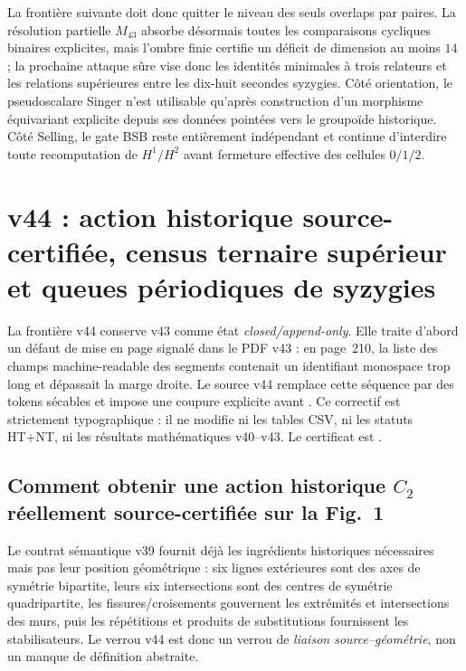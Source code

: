 \documentclass[11pt,a4paper]{article}
\begin{document}
La frontière suivante doit donc quitter le niveau des seuls overlaps par paires. La résolution partielle $M_{43}$ absorbe désormais toutes les comparaisons cycliques binaires explicites, mais l'ombre finie certifie un déficit de dimension au moins $14$ ; la prochaine attaque sûre vise donc les identités minimales à trois relateurs et les relations supérieures entre les dix-huit secondes syzygies. Côté orientation, le pseudoscalare Singer n'est utilisable qu'après construction d'un morphisme équivariant explicite depuis ses données pointées vers le groupoïde historique. Côté Selling, le gate BSB reste entièrement indépendant et continue d'interdire toute recomputation de $H^1/H^2$ avant fermeture effective des cellules $0/1/2$.

\section{v44 : action historique source-certifiée, census ternaire supérieur et queues périodiques de syzygies}
\label{sec:v44-source-action-triples-periodic}

La frontière v44 conserve v43 comme état \emph{closed/append-only}. Elle traite d'abord un défaut de mise en page signalé dans le PDF v43 : en page~210, la liste des champs machine-readable des segments contenait un identifiant monospace trop long et dépassait la marge droite. Le source v44 remplace cette séquence par des tokens  sécables et impose une coupure explicite avant . Ce correctif est strictement typographique : il ne modifie ni les tables CSV, ni les statuts HT+NT, ni les résultats mathématiques v40--v43. Le certificat est .

\subsection{Comment obtenir une action historique $C_2$ réellement source-certifiée sur la Fig.~1}

Le contrat sémantique v39 fournit déjà les ingrédients historiques nécessaires mais pas leur position géométrique : six lignes extérieures sont des axes de symétrie bipartite, leurs six intersections sont des centres de symétrie quadripartite, les fissures/croisements gouvernent les extrémités et intersections des murs, puis les répétitions et produits de substitutions fournissent les stabilisateurs. Le verrou v44 est donc un verrou de \emph{liaison source--géométrie}, non un manque de définition abstraite.
\end{document}
